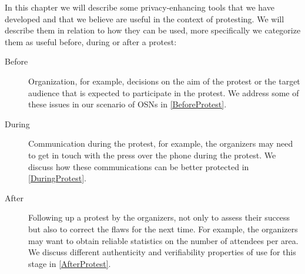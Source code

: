 In this chapter we will describe some privacy-enhancing tools that we have 
developed and that we believe are useful in the context of protesting.
We will describe them in relation to how they can be used, more specifically we 
categorize them as useful before, during or after a protest:
\begin{description}
  \item[Before]
    Organization, for example, decisions on the aim of the protest or the 
    target audience that is expected to participate in the protest.
    We address some of these issues in our scenario of \acp{OSN} in 
    \cref{BeforeProtest}.

  \item[During]
    Communication during the protest, for example, the organizers may need to 
    get in touch with the press over the phone during the protest.
    We discuss how these communications can be better protected in 
    \cref{DuringProtest}.

  \item[After]
    Following up a protest by the organizers, not only to assess their success 
    but also to correct the flaws for the next time.  For example, the 
    organizers may want to obtain reliable statistics on the number of 
    attendees per area.
    We discuss different authenticity and verifiability properties of use for 
    this stage in \cref{AfterProtest}.
\end{description}

